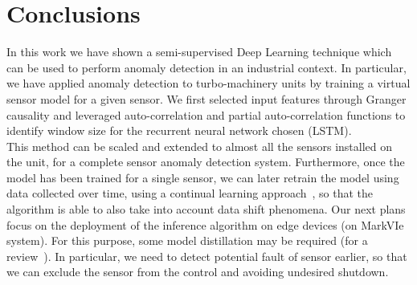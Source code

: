 \documentclass[runningheads]{llncs}
\begin{document}


%


\section{Conclusions}

In this work we have shown a semi-supervised Deep Learning technique which can be used to perform anomaly detection in an industrial context. In particular, we have applied anomaly detection to turbo-machinery units by training a virtual sensor model for a given sensor. We first selected input features through Granger causality and leveraged auto-correlation and partial auto-correlation functions to identify window size for the recurrent neural network chosen (LSTM).\\
This method can be scaled and extended to almost all the sensors installed on the unit, for a complete sensor anomaly detection system.
Furthermore, once the model has been trained for a single sensor, we can later retrain the model using data collected over time, using a continual learning approach~\cite{rebuffi2017icarl}, so that the algorithm is able to also take into account data shift phenomena.
Our next plans focus on the deployment of the inference algorithm on edge devices (on MarkVIe system). For this purpose, some model distillation  may be required (for a review~\cite{gou2021}). In particular, we need to detect potential fault of sensor earlier, so that we can exclude the sensor from the control and avoiding undesired shutdown.
\end{document}
